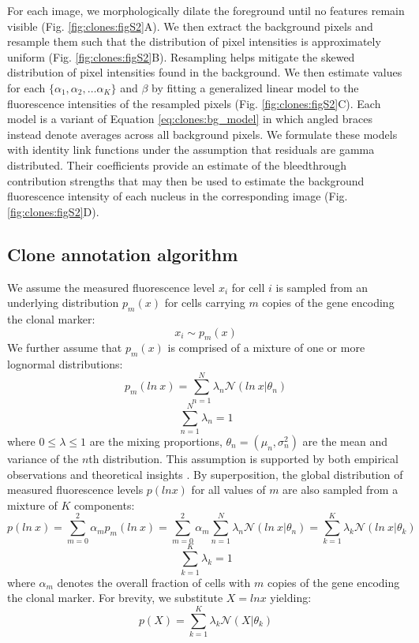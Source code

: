 For each image, we morphologically dilate the foreground until no features remain visible (Fig. \ref{fig:clones:figS2}A). We then extract the background pixels and resample them such that the distribution of pixel intensities is approximately uniform (Fig. \ref{fig:clones:figS2}B). Resampling helps mitigate the skewed distribution of pixel intensities found in the background. We then estimate values for each $\{\alpha_1, \alpha_2, \ldots \alpha_K\}$ and $\beta$ by fitting a generalized linear model to the fluorescence intensities of the resampled pixels (Fig. \ref{fig:clones:figS2}C). Each model is a variant of Equation \ref{eq:clones:bg_model} in which angled braces instead denote averages across all background pixels. We formulate these models with identity link functions under the assumption that residuals are gamma distributed. Their coefficients provide an estimate of the bleedthrough contribution strengths that may then be used to estimate the background fluorescence intensity of each nucleus in the corresponding image (Fig. \ref{fig:clones:figS2}D).

\subsection{Clone annotation algorithm} \label{clones:methods:annotation}
\label{appendix:methods:clones:annotation}

We assume the measured fluorescence level $x_i$ for cell $i$ is sampled from an underlying distribution $p_m(x)$ for cells carrying $m$ copies of the gene encoding the clonal marker:
\begin{equation}
x_i \sim p_m(x)
\end{equation}
We further assume that $p_m(x)$ is comprised of a mixture of one or more lognormal distributions:
\begin{equation}
p_m(ln\ x) = \sum^{N}_{n=1}\lambda_n \mathcal{N}(ln\ x|\theta_{n})
\end{equation}
\begin{equation}
\sum^{N}_{n=1}\lambda_n=1
\end{equation}
where $0 \leq \lambda \leq 1$ are the mixing proportions, $\theta_n=(\mu_n,\sigma_n^2)$ are the mean and variance of the $n$th distribution. This assumption is supported by both empirical observations and theoretical insights \cite{Furusawa2005,Beal2017}. By superposition, the global distribution of measured fluorescence levels $p(ln x)$ for all values of $m$ are also sampled from a mixture of $K$ components:
\begin{equation}
p(ln\ x) =  \sum^{2}_{m=0} \alpha_m p_m(ln\ x) = \sum^{2}_{m=0} \alpha_m 
\sum^{N}_{n=1}\lambda_n \mathcal{N}(ln\ x|\theta_{n}) = \sum^{K}_{k=1}\lambda_k \mathcal{N}(ln\ x|\theta_{k})
\end{equation}
\begin{equation}
\sum^{K}_{k=1}\lambda_k=1
\end{equation}
where $\alpha_m$ denotes the overall fraction of cells with $m$ copies of the gene encoding the clonal marker. For brevity, we substitute $X = ln x$ yielding:
\begin{equation}
p(X) = \sum^{K}_{k=1}\lambda_k \mathcal{N}(X|\theta_{k})
\end{equation}

